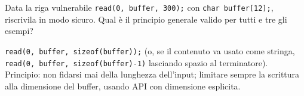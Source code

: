 \question[5]
Data la riga vulnerabile \lstinline|read(0, buffer, 300);| con \lstinline|char buffer[12];|, riscrivila in modo sicuro. Qual è il principio generale valido per tutti e tre gli esempi?
\begin{solution}
\lstinline|read(0, buffer, sizeof(buffer));| (o, se il contenuto va usato come stringa, \lstinline|read(0, buffer, sizeof(buffer)-1)| lasciando spazio al terminatore).
Principio: non fidarsi mai della lunghezza dell'input; limitare sempre la scrittura alla dimensione del buffer, usando API con dimensione esplicita.
\end{solution}
